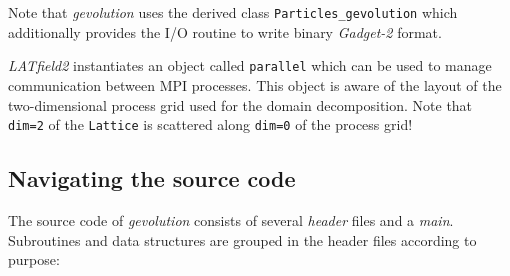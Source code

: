 \documentclass[a4paper,10pt]{article}
\begin{document}
\begin{itemize}
 Note that \textit{gevolution} uses the derived class \texttt{Particles\_gevolution} which additionally provides the I/O routine to write
 binary \textit{Gadget-2} format.
 
\end{itemize}

\noindent \textit{LATfield2} instantiates an object called \texttt{parallel} which can be used to manage communication between MPI
processes. This object is aware of the layout of the two-dimensional process grid used for the domain decomposition. Note that
\texttt{dim=2} of the \texttt{Lattice} is scattered along \texttt{dim=0} of the process grid!


\subsection{Navigating the source code}

The source code of \textit{gevolution} consists of several \textit{header} files and a \textit{main}. Subroutines and data structures are grouped in the header files according to purpose:
\end{document}
